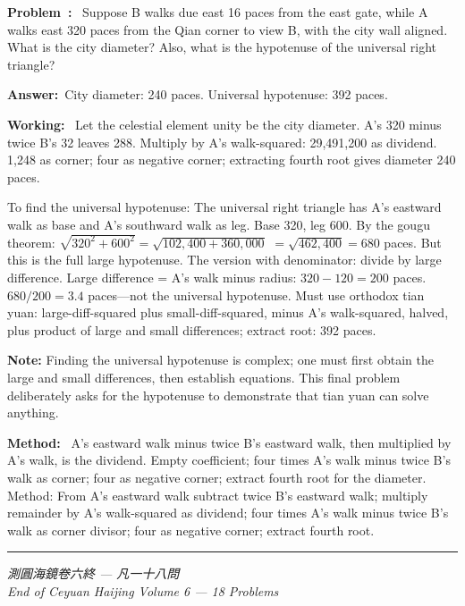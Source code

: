 \documentclass[9pt,a4paper]{article}
\newcommand{\longline}{\noindent\rule{\textwidth}{0.4pt}}
\newcounter{overallnum}
\newcommand{\eproblem}[1]{\par\noindent\textbf{\color{volcolor}Problem~\theoverallnum:}~#1\par\vspace{0.15cm}}
\newcommand{\eanswer}[1]{\par\noindent\textbf{Answer:}~#1\par\vspace{0.15cm}}
\newcommand{\eworking}[1]{\par\noindent\textbf{Working:}~#1\par\vspace{0.15cm}}
\newcommand{\emethod}[1]{\par\noindent\textbf{Method:}~#1\par\vspace{0.25cm}}
\begin{document}
\begin{minipage}[t]{0.50\textwidth}
\eproblem{
Suppose B walks due east 16 paces from the east gate, while A walks east 320
paces from the Qian corner to view B, with the city wall aligned. What is
the city diameter? Also, what is the hypotenuse of the universal right triangle?
}

\eanswer{City diameter: 240 paces. Universal hypotenuse: 392 paces.}

\eworking{
Let the celestial element unity be the city diameter. A's 320 minus twice
B's 32 leaves 288. Multiply by A's walk-squared: 29,491,200 as dividend.
1,248 as corner; four as negative corner; extracting fourth root gives
diameter 240 paces.

To find the universal hypotenuse: The universal right triangle has A's
eastward walk as base and A's southward walk as leg. Base 320, leg 600.
By the gougu theorem: $\sqrt{320^2 + 600^2} = \sqrt{102{,}400 + 360{,}000}$
$= \sqrt{462{,}400} = 680$ paces. But this is the full large hypotenuse.
The version with denominator: divide by large difference.
Large difference = A's walk minus radius: $320 - 120 = 200$ paces.
$680 / 200 = 3.4$ paces---not the universal hypotenuse. Must use orthodox
tian yuan: large-diff-squared plus small-diff-squared, minus A's walk-squared,
halved, plus product of large and small differences; extract root: 392 paces.

\textbf{Note:} Finding the universal hypotenuse is complex; one must first
obtain the large and small differences, then establish equations. This final
problem deliberately asks for the hypotenuse to demonstrate that tian yuan
can solve anything.
}

\emethod{
A's eastward walk minus twice B's eastward walk, then multiplied by A's walk,
is the dividend. Empty coefficient; four times A's walk minus twice B's walk
as corner; four as negative corner; extract fourth root for the diameter.
Method: From A's eastward walk subtract twice B's eastward walk; multiply
remainder by A's walk-squared as dividend; four times A's walk minus twice
B's walk as corner divisor; four as negative corner; extract fourth root.
}
\end{minipage}
\vspace{0.15cm}

\vspace{0.4cm}
\longline
\begin{center}
\textit{測圓海鏡卷六終 --- 凡一十八問}\\[0.2cm]
\textit{End of Ceyuan Haijing Volume 6 --- 18 Problems}
\end{center}
\end{document}
